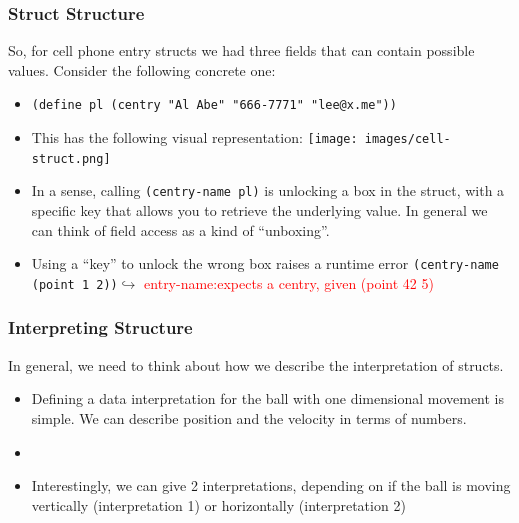 \documentclass{beamer}
\begin{document}
\begin{frame}
  \frametitle{Struct Structure}
  So, for cell phone entry structs we had three fields that can contain
  possible values. Consider the following concrete one:
  \begin{itemize}
  \item<2->
    \texttt{(define pl (centry "Al Abe" "666-7771" "lee@x.me"))}
  \item<3-> This has the following visual representation:
    \texttt{[image: images/cell-struct.png]}
  \item<4-> In a sense, calling \texttt{(centry-name pl)} is unlocking a box in the struct, with a specific key that
    allows you to retrieve the underlying value. In general we can
    think of field access as a kind of ``unboxing''.
  \item<5-> Using a ``key'' to unlock the wrong box raises a runtime
    error \texttt{(centry-name (point 1 2))}$\hookrightarrow$ \textcolor{red}{entry-name:expects a centry, given (point 42 5)}    
  \end{itemize}
\end{frame}


\begin{frame}
  \frametitle{Interpreting Structure}
  In general, we need to think about how we describe the
  interpretation of structs.
  \begin{itemize}
  \item<2-> Defining a data interpretation for the ball with one dimensional  movement is simple. We can describe position and the
    velocity in terms of numbers.
  \item<3-> \BallInterp
  \item<4-> Interestingly, we can give 2 interpretations, depending
    on if the ball is moving vertically (interpretation 1) or
    horizontally (interpretation 2)
  \end{itemize}
\end{frame}

\end{document}
